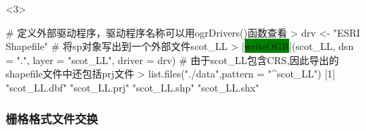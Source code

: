 \begin{frame}[t,fragile]{\subsecname}{\subsubsecname}
\begin{overlayarea}{\textwidth}{\textheight}
\begin{onlyenv}<3>
\begin{rcode}
# 定义外部驱动程序，驱动程序名称可以用ogrDrivers()函数查看
> drv <- "ESRI Shapefile"
# 将sp对象写出到一个外部文件scot\_LL
> |\colorbox{green}{writeOGR}|(scot_LL, dsn = ".", layer = "scot_LL", driver = drv)
# 由于scot\_LL包含CRS,因此导出的shapefile文件中还包括prj文件
> list.files("./data",pattern = "^scot_LL")
[1] "scot_LL.dbf" "scot_LL.prj" "scot_LL.shp" "scot_LL.shx"
\end{rcode}
\end{onlyenv}
\end{overlayarea}
\end{frame}

\subsubsection{栅格格式文件交换}
